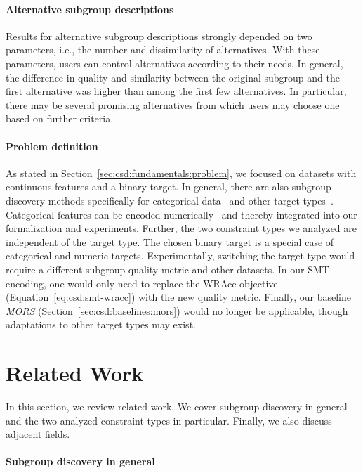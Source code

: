 \documentclass[acmsmall]{acmart} %
\theoremstyle{acmplain}
\theoremstyle{acmdefinition}
\begin{document}
\paragraph{Alternative subgroup descriptions}

Results for alternative subgroup descriptions strongly depended on two parameters, i.e., the number and dissimilarity of alternatives.
With these parameters, users can control alternatives according to their needs.
In general, the difference in quality and similarity between the original subgroup and the first alternative was higher than among the first few alternatives.
In particular, there may be several promising alternatives from which users may choose one based on further criteria.

\paragraph{Problem definition}

As stated in Section~\ref{sec:csd:fundamentals:problem}, we focused on datasets with continuous features and a binary target.
In general, there are also subgroup-discovery methods specifically for categorical data~\cite{herrera2011overview} and other target types~\cite{atzmueller2015subgroup}.
Categorical features can be encoded numerically~\cite{matteucci2023benchmark} and thereby integrated into our formalization and experiments.
Further, the two constraint types we analyzed are independent of the target type.
The chosen binary target is a special case of categorical and numeric targets.
Experimentally, switching the target type would require a different subgroup-quality metric and other datasets.
In our SMT encoding, one would only need to replace the WRAcc objective (Equation~\ref{eq:csd:smt-wracc}) with the new quality metric.
Finally, our baseline \emph{MORS} (Section~\ref{sec:csd:baselines:mors}) would no longer be applicable, though adaptations to other target types may exist.

\section{Related Work}
\label{sec:csd:related-work}

In this section, we review related work.
We cover subgroup discovery in general and the two analyzed constraint types in particular.
Finally, we also discuss adjacent fields.

\paragraph{Subgroup discovery in general}
\end{document}
